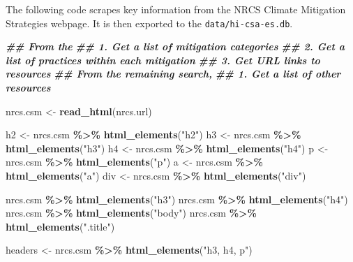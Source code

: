 \documentclass[
]{article}
\newenvironment{Shaded}{\begin{snugshade}}{\end{snugshade}}
\newcommand{\DocumentationTok}[1]{\textcolor[rgb]{0.56,0.35,0.01}{\textbf{\textit{#1}}}}
\newcommand{\FunctionTok}[1]{\textcolor[rgb]{0.13,0.29,0.53}{\textbf{#1}}}
\newcommand{\NormalTok}[1]{#1}
\newcommand{\OtherTok}[1]{\textcolor[rgb]{0.56,0.35,0.01}{#1}}
\newcommand{\SpecialCharTok}[1]{\textcolor[rgb]{0.81,0.36,0.00}{\textbf{#1}}}
\newcommand{\StringTok}[1]{\textcolor[rgb]{0.31,0.60,0.02}{#1}}
\begin{document}
The following code scrapes key information from the NRCS Climate
Mitigation Strategies webpage. It is then exported to the
\texttt{data/hi-csa-es.db}.

\begin{Shaded}
\begin{Highlighting}[]
\DocumentationTok{\#\# From the }
\DocumentationTok{\#\# 1. Get a list of mitigation categories}
\DocumentationTok{\#\# 2. Get a list of practices within each mitigation}
\DocumentationTok{\#\# 3. Get URL links to resources}
\DocumentationTok{\#\# From the remaining search,}
\DocumentationTok{\#\# 1. Get a list of other resources}



\NormalTok{nrcs.csm }\OtherTok{\textless{}{-}} \FunctionTok{read\_html}\NormalTok{(nrcs.url)}

\NormalTok{h2 }\OtherTok{\textless{}{-}}\NormalTok{ nrcs.csm }\SpecialCharTok{\%\textgreater{}\%} \FunctionTok{html\_elements}\NormalTok{(}\StringTok{"h2"}\NormalTok{)}
\NormalTok{h3 }\OtherTok{\textless{}{-}}\NormalTok{ nrcs.csm }\SpecialCharTok{\%\textgreater{}\%} \FunctionTok{html\_elements}\NormalTok{(}\StringTok{"h3"}\NormalTok{)}
\NormalTok{h4 }\OtherTok{\textless{}{-}}\NormalTok{ nrcs.csm }\SpecialCharTok{\%\textgreater{}\%} \FunctionTok{html\_elements}\NormalTok{(}\StringTok{"h4"}\NormalTok{)}
\NormalTok{p }\OtherTok{\textless{}{-}}\NormalTok{ nrcs.csm }\SpecialCharTok{\%\textgreater{}\%} \FunctionTok{html\_elements}\NormalTok{(}\StringTok{"p"}\NormalTok{)}
\NormalTok{a }\OtherTok{\textless{}{-}}\NormalTok{ nrcs.csm }\SpecialCharTok{\%\textgreater{}\%} \FunctionTok{html\_elements}\NormalTok{(}\StringTok{"a"}\NormalTok{)}
\NormalTok{div }\OtherTok{\textless{}{-}}\NormalTok{ nrcs.csm }\SpecialCharTok{\%\textgreater{}\%} \FunctionTok{html\_elements}\NormalTok{(}\StringTok{"div"}\NormalTok{)}

\NormalTok{nrcs.csm }\SpecialCharTok{\%\textgreater{}\%} \FunctionTok{html\_elements}\NormalTok{(}\StringTok{"h3"}\NormalTok{)}
\NormalTok{nrcs.csm }\SpecialCharTok{\%\textgreater{}\%} \FunctionTok{html\_elements}\NormalTok{(}\StringTok{"h4"}\NormalTok{)}
\NormalTok{nrcs.csm }\SpecialCharTok{\%\textgreater{}\%} \FunctionTok{html\_elements}\NormalTok{(}\StringTok{"body"}\NormalTok{)}
\NormalTok{nrcs.csm }\SpecialCharTok{\%\textgreater{}\%} \FunctionTok{html\_elements}\NormalTok{(}\StringTok{".title"}\NormalTok{)}

\NormalTok{headers }\OtherTok{\textless{}{-}}\NormalTok{ nrcs.csm }\SpecialCharTok{\%\textgreater{}\%} \FunctionTok{html\_elements}\NormalTok{(}\StringTok{"h3, h4, p"}\NormalTok{)}


\end{Highlighting}
\end{Shaded}
\end{document}
